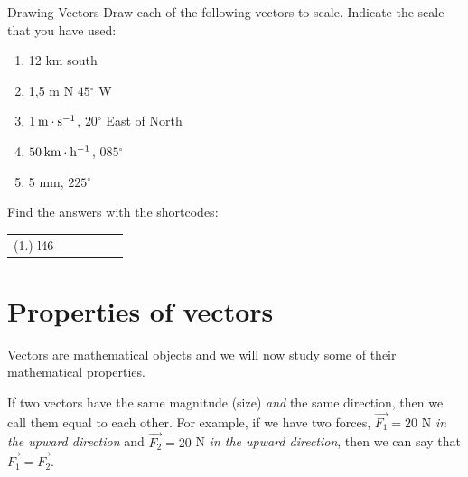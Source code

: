 \label{m38812*secfhsst!!!underscore!!!id228}
\begin{exercises}{Drawing Vectors}
            \nopagebreak
            \label{m38812*id188088}Draw each of the following vectors to scale. Indicate the scale that you have used:
      \label{m38812*id188094}\begin{enumerate}[noitemsep, label=\textbf{\arabic*}. ] 
            \label{m38812*uid30}\item 12 km south
\label{m38812*uid31}\item 1,5 m N $45{}^{\circ }$ W
\label{m38812*uid32}\item $1\phantom{\rule{2pt}{0ex}}\text{m}\ensuremath{\cdot}\text{s}{}^{-1}$, $20{}^{\circ }$ East of North
\label{m38812*uid33}\item $50\phantom{\rule{2pt}{0ex}}\text{km}\ensuremath{\cdot}\text{h}{}^{-1}$, $085{}^{\circ }$\label{m38812*uid34}\item 5 mm, $225{}^{\circ }$\end{enumerate}
                \par 
  \label{m38812**end}
\par {} Find the answers with the shortcodes:
 \par \begin{tabular}[h]{cccccc}
 (1.) l46  & \end{tabular}
\end{exercises}
         

\section{Properties of vectors}
    \nopagebreak
    \label{m38813*cid7}
      \label{m38813*id188277}

Vectors are mathematical objects and we will now study some of their mathematical properties. 

If two vectors have the same magnitude (size) \textit{and} the same direction, then we call them equal to each other. For example, if we have two forces,  $\stackrel{\to }{F_{1}} = 20$ N \textit{in the upward direction} and $\stackrel{\to }{F_{2}} = 20$ N \textit{in the upward direction}, then we can say that $\stackrel{\to }{F_{1}} = \stackrel{\to }{F_{2}}$.

